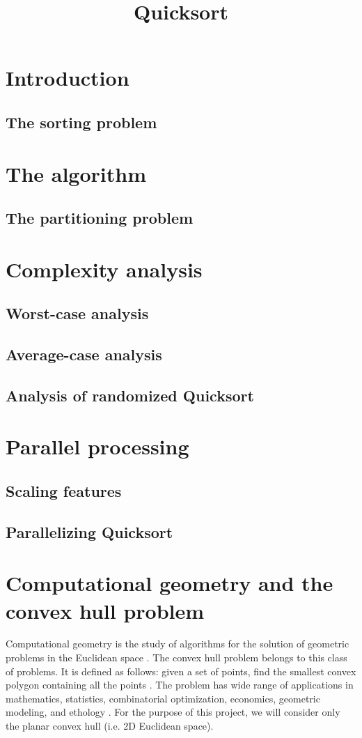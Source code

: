\documentclass[]{finalproject}
\title{Quicksort}
\subtitle{}
\begin{document}
\maketitle

\section{Introduction} \label{introduction}
\subsection{The sorting problem}

\section{The algorithm}
\subsection{The partitioning problem}

\section{Complexity analysis}
\subsection{Worst-case analysis}
\subsection{Average-case analysis}
\subsection{Analysis of randomized Quicksort}

\section{Parallel processing}
\subsection{Scaling features}
\subsection{Parallelizing Quicksort}

\section{Computational geometry and the convex hull problem}
Computational geometry is the study of algorithms for the solution of geometric problems in the Euclidean space \cite{paper}.
The convex hull problem belongs to this class of problems. It is defined as follows:
given a set of points, find the smallest convex polygon containing all the points \cite{geowiki}.
The problem has wide range of applications in
mathematics, statistics, combinatorial optimization, economics, geometric modeling, and ethology \cite{chwiki}.
For the purpose of this project, we will consider only the planar convex hull (i.e. 2D Euclidean space).
\end{document}
